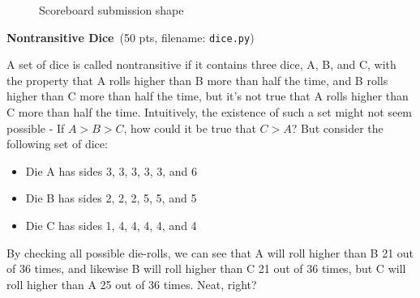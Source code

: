 \documentclass[11pt]{cselabheader}
\newcommand{\cop}[3]{\textbf{#1}~(#2 pts, filename: \texttt{#3})\quad}
\theoremstyle{plain}
\begin{document}
\begin{enumerate}
    \begin{figure}[!ht]
      \centering
      \caption{Scoreboard submission shape}
    \end{figure}

  \item \cop{Nontransitive Dice}{50}{dice.py}

    A set of dice is called nontransitive if it contains three dice,
    A, B, and C, with the property that A rolls higher than B more
    than half the time, and B rolls higher than C more than half
    the time, but it's not true that A rolls higher than C more than
    half the time. Intuitively, the existence of such a set might not
    seem possible - If $A > B > C$, how could it be true that $C > A$?
    But consider the following set of dice:

    \begin{itemize}
      \item Die A has sides 3, 3, 3, 3, 3, and 6
      \item Die B has sides 2, 2, 2, 5, 5, and 5
      \item Die C has sides 1, 4, 4, 4, 4, and 4
    \end{itemize}
    By checking all possible die-rolls, we can see that A will roll
    higher than B 21 out of 36 times, and likewise B will roll higher
    than C 21 out of 36 times, but C will roll higher than A 25 out
    of 36 times. Neat, right?


\end{enumerate}
\end{document}
